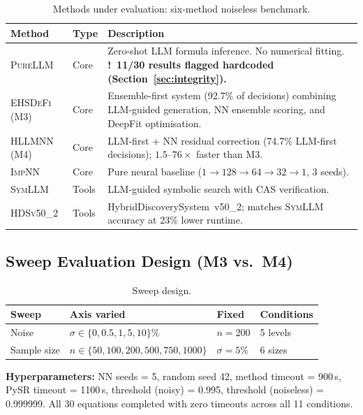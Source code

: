 \documentclass[twoside,11pt]{article}
\newcommand{\PureLLM}{\textsc{PureLLM}}
\newcommand{\INN}{\textsc{ImpNN}}
\newcommand{\EHD}{\textsc{EHSDeFi}}
\newcommand{\HSL}{\textsc{HLLMNN}}
\newcommand{\SEL}{\textsc{SymLLM}}
\newcommand{\HDS}{\textsc{HDSv50\_2}}
\newcommand{\warn}{{\color{warnAmber}\textbf{!}}}
\begin{document}
\begin{table}[ht]
\caption{Methods under evaluation: six-method noiseless benchmark.}
\label{tab:methods}
\centering
\small
\renewcommand{\arraystretch}{1.3}
\begin{tabular}{L{2.1cm} L{1.3cm} L{8.0cm}}
\toprule
\textbf{Method} & \textbf{Type} & \textbf{Description} \\
\midrule
{}
\PureLLM & Core &
  Zero-shot LLM formula inference.  No numerical fitting.
  \textbf{\warn~11/30 results flagged hardcoded (Section~\ref{sec:integrity}).} \\
\EHD\,(M3) & Core &
  Ensemble-first system (92.7\% of decisions) combining LLM-guided generation,
  NN ensemble scoring, and DeepFit optimisation. \\
\HSL\,(M4) & Core &
  LLM-first + NN residual correction (74.7\% LLM-first decisions);
  $1.5$--$76\times$ faster than M3. \\
\INN & Core &
  Pure neural baseline ($1\!\to\!128\!\to\!64\!\to\!32\!\to\!1$, 3 seeds). \\
\SEL & Tools &
  LLM-guided symbolic search with CAS verification. \\
\HDS & Tools &
  HybridDiscoverySystem~v50\_2; matches \SEL{} accuracy at 23\% lower runtime. \\
\bottomrule
\end{tabular}
\end{table}

\subsection{Sweep Evaluation Design (M3 vs.\ M4)}
\label{sec:methods:sweep}

\begin{table}[ht]
\centering
\caption{Sweep design.}
\label{tab:sweeps}
\begin{tabular}{L{2.5cm} L{4.3cm} L{2.5cm} C{2.0cm}}
\toprule
\textbf{Sweep} & \textbf{Axis varied} & \textbf{Fixed} & \textbf{Conditions}\\
\midrule
Noise       & $\sigma \in \{0, 0.5, 1, 5, 10\}\%$ & $n=200$       & 5 levels \\
Sample size & $n \in \{50,100,200,500,750,1000\}$  & $\sigma=5\%$ & 6 sizes  \\
\bottomrule
\end{tabular}
\end{table}

\noindent\textbf{Hyperparameters:} NN seeds = 5, random seed 42,
method timeout = 900\,s, PySR timeout = 1100\,s,
threshold (noisy) = 0.995, threshold (noiseless) = 0.999999.
All 30 equations completed with zero timeouts across all 11 conditions.
\end{document}
